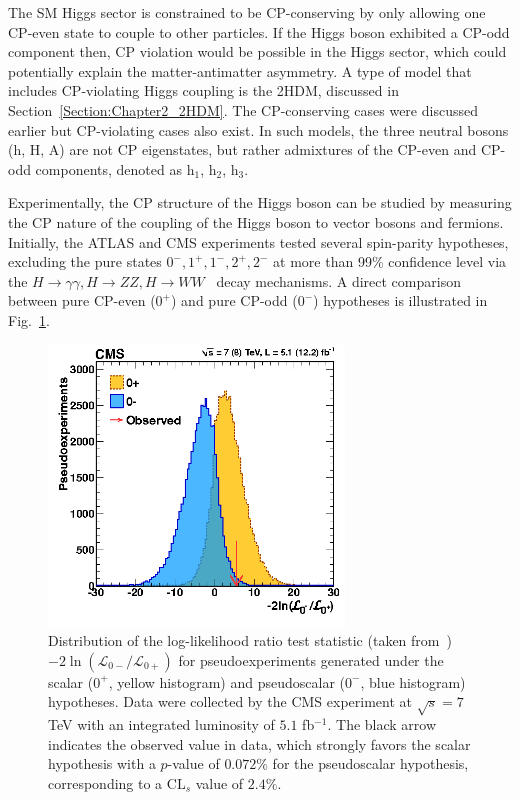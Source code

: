 The SM Higgs sector is constrained to be CP-conserving by only allowing one CP-even state to couple to other particles. If the Higgs boson exhibited a CP-odd component then, CP violation would be possible in the Higgs sector, which could potentially explain the matter-antimatter asymmetry. A type of model that includes CP-violating Higgs coupling is the 2HDM, discussed in Section~\ref{Section:Chapter2_2HDM}. The CP-conserving cases were discussed earlier but CP-violating cases also exist. In such models, the three neutral bosons (h, H, A) are not CP eigenstates, but rather admixtures of the CP-even and CP-odd components, denoted as h$_1$, h$_2$, h$_3$.

Experimentally, the CP structure of the Higgs boson can be studied by measuring the CP nature of the coupling of the Higgs boson to vector bosons and fermions. Initially, the ATLAS and CMS experiments tested several spin-parity hypotheses, excluding the pure states $0^-,1^+,1^-,2^+,2^-$ at more than 99\% confidence level via the $H\to \gamma\gamma, H\to ZZ, H\to WW$~\cite{CP_constraints_1,CP_constraints_2,CP_constraints_3} decay mechanisms. A direct comparison between pure CP-even ($0^+$) and pure CP-odd ($0^-$) hypotheses is illustrated in Fig.~\ref{Figure:Chapter2_CPevenVsCPodd}. 

\begin{figure}[h]
\centering
\includegraphics[width= 0.7\textwidth]{Figures/Chapter2/SpinParity.png}
\caption{Distribution of the log-likelihood ratio test statistic (taken from~\cite{CP_constraints_2}) $-2\ln(\mathcal{L}_{0-}/\mathcal{L}_{0+})$ for pseudoexperiments generated under the scalar ($0^+$, yellow histogram) and pseudoscalar ($0^-$, blue histogram) hypotheses. Data were collected by the CMS experiment at $\sqrt{s} = 7$ TeV with an integrated luminosity of $5.1$ fb$^{-1}$. The black arrow indicates the observed value in data, which strongly favors the scalar hypothesis with a $p$-value of $0.072\%$ for the pseudoscalar hypothesis, corresponding to a $\text{CL}_s$ value of $2.4\%$.}\label{Figure:Chapter2_CPevenVsCPodd}
\end{figure}

